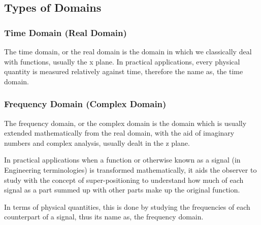 

\subsection{{Types of Domains}}
	
	\subsubsection{{Time Domain (Real Domain)}}
	
		{The time domain, or the real domain is the domain in which we classically deal with functions, usually the x plane. In practical applications, every physical quantity is measured relatively against time, therefore the name as, the time domain.}	
	
	\subsubsection{{Frequency Domain (Complex Domain)}}

		{The frequency domain, or the complex domain is the domain which is usually extended mathematically from the real domain, with the aid of imaginary numbers and complex analysis, usually dealt in the z plane.}	

		{In practical applications when a function or otherwise known as a signal (in Engineering terminologies) is transformed mathematically, it aids the observer to study with the concept of super-positioning to understand how much of each signal as a part summed up with other parts make up the original function.}

		{In terms of physical quantities, this is done by studying the frequencies of each counterpart of a signal, thus its name as, the frequency domain.}


